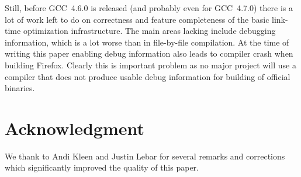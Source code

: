 \documentclass[final]{ols}
\begin{document}
Still, before GCC~4.6.0 is released (and probably even for GCC~4.7.0) there is
a lot of work left to do on correctness and feature completeness of the basic
link-time optimization infrastructure.  The main areas lacking include
debugging information, which is a lot worse than in file-by-file compilation.
At the time of writing this paper enabling debug information also leads to
compiler crash when building Firefox.  Clearly this is important problem as no
major project will use a compiler that does not produce usable debug
information for building of official binaries.

\section{Acknowledgment}
We thank to Andi Kleen and Justin Lebar for several remarks and corrections
which significantly improved the quality of this paper.
\end{document}
